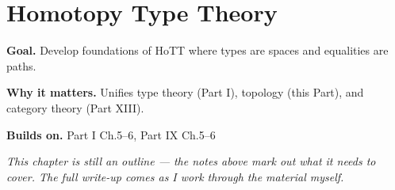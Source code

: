\chapter{Homotopy Type Theory}
\label{ch:09-topology-11}

\begin{chapterintro}
\textbf{Goal.} Develop foundations of HoTT where types are spaces and equalities are paths.

\textbf{Why it matters.} Unifies type theory (Part I), topology (this Part), and category theory (Part XIII).

\textbf{Builds on.} Part I Ch.5–6, Part IX Ch.5–6
\end{chapterintro}

\textit{This chapter is still an outline --- the notes above mark out what it needs to cover. The full write-up comes as I work through the material myself.}
